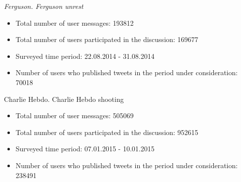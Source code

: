 \textit{Ferguson. Ferguson unrest}
\begin{itemize}
	\item Total number of user messages: 193812
	\item Total number of users participated in the discussion: 169677
	\item Surveyed time period: 22.08.2014 - 31.08.2014
	\item Number of users who published tweets in the period under consideration: 70018
\end{itemize}

Charlie Hebdo. Charlie Hebdo shooting
\begin{itemize}
	\item Total number of user messages: 505069
	\item Total number of users participated in the discussion: 952615
	\item Surveyed time period: 07.01.2015 - 10.01.2015
	\item Number of users who published tweets in the period under consideration: 238491
\end{itemize}



